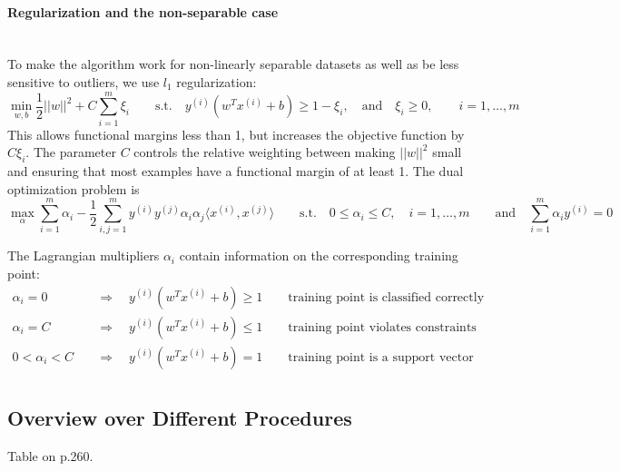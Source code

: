     \paragraph{Regularization and the non-separable case}~\\
    To make the algorithm work for non-linearly separable datasets as well as be less sensitive to outliers, we use $l_1$ regularization:
    \begin{equation*}
        \min_{w,b} \frac{1}{2}||w||^2 + C \sum\limits_{i=1}^m \xi_i
        \qquad \text{s.t.} \quad
        y^{(i)}(w^T x^{(i)} + b) \geq 1-\xi_i,
        \quad \text{and} \quad
        \xi_i \geq 0,
        \qquad i=1,\ldots,m
    \end{equation*}
    This allows functional margins less than 1, but increases the objective function by $C\xi_i$.
    The parameter $C$ controls the relative weighting between making $||w||^2$ small and ensuring that most examples have a functional margin of at least 1.
    The dual optimization problem is
    \begin{equation*}
        \max_{\alpha} \sum\limits_{i=1}^m \alpha_i - \frac{1}{2}\sum\limits_{i,j=1}^m y^{(i)} y^{(j)} \alpha_i \alpha_j \langle x^{(i)},x^{(j)} \rangle
        \qquad \text{s.t.} \quad
        0 \leq \alpha_i \leq C, \quad i=1,\ldots,m
        \qquad \text{and} \quad
        \sum\limits_{i=1}^m \alpha_i y^{(i)}=0
    \end{equation*}
    
    The Lagrangian multipliers $\alpha_i$ contain information on the corresponding training point:
    \begin{align*}
        \alpha_i = 0 & \quad\Rightarrow\quad y^{(i)}(w^T x^{(i)}+b) \geq 1 \qquad \text{training point is classified correctly}\\
        \alpha_i = C & \quad\Rightarrow\quad y^{(i)}(w^T x^{(i)}+b) \leq 1 \qquad \text{training point violates constraints}\\
        0 < \alpha_i < C & \quad\Rightarrow\quad y^{(i)}(w^T x^{(i)}+b) = 1 \qquad \text{training point is a support vector}\\
    \end{align*}
 	
   \subsection{Overview over Different Procedures}
   Table on p.260.
 	
